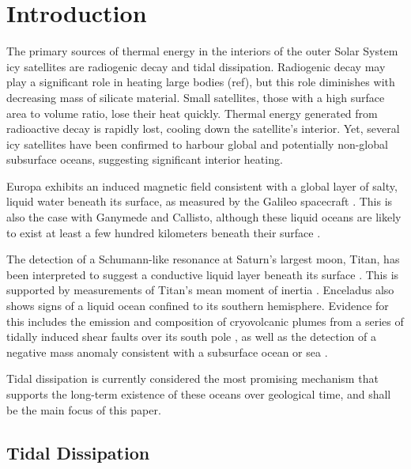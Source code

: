 \newpage
\section{Introduction}


The primary sources of thermal energy in the interiors of the outer Solar System icy satellites are radiogenic decay and tidal dissipation. Radiogenic decay may play a significant role in heating large bodies (ref), but this role diminishes with decreasing mass of silicate material. Small satellites, those with a high surface area to volume ratio, lose their heat quickly. Thermal energy generated from radioactive decay is rapidly lost, cooling down the satellite's interior. Yet, several icy satellites have been confirmed to harbour global and potentially non-global subsurface oceans, suggesting significant interior heating.

Europa exhibits an induced magnetic field consistent with a global layer of salty, liquid water beneath its surface, as measured by the Galileo spacecraft \citep{zimmer2000subsurface, kivelson2000galileo, hand2007empirical}. This is also the case with Ganymede and Callisto, although these liquid oceans are likely to exist at least a few hundred kilometers beneath their surface \citep{zimmer2000subsurface, kivelson2000galileo}. 

The detection of a Schumann-like resonance at Saturn's largest moon, Titan, has been interpreted to suggest a conductive liquid layer beneath its surface \citep{beghin2010titan}. This is supported by measurements of Titan's mean moment of inertia \citep{bills2011rotational}. Enceladus also shows signs of a liquid ocean confined to its southern hemisphere. Evidence for this includes the emission and composition of cryovolcanic plumes from a series of tidally induced shear faults over its south pole \citep{hansen2011composition}, as well as the detection of a negative mass anomaly consistent with a subsurface ocean or sea \citep{iess2014gravity}. 

Tidal dissipation is currently considered the most promising mechanism that supports the long-term existence of these oceans over geological time, and shall be the main focus of this paper.

\subsection{Tidal Dissipation}

